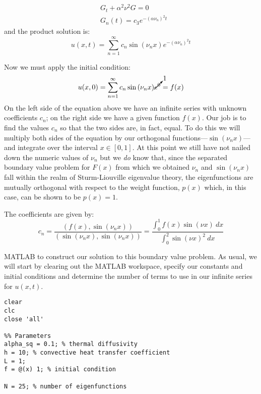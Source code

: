 \begin{align*}
&G_{t} + \alpha^2 \nu^2 G = 0 \\
&G_n(t) = c_3e^{-\left(\alpha \nu_n \right)^2 t}
\end{align*}
and the product solution is:
\begin{equation*}
u(x,t) = \sum\limits_{n=1}^{\infty} c_n \sin{(\nu_n x)}e^{-\left(\alpha \nu_n \right)^2t}
\end{equation*}

\vspace{0.25cm}

\noindent Now we must apply the initial condition:
\begin{equation*}
u(x,0) = \sum\limits_{n=1}^{\infty}c_n \sin{(\nu_n x)}\cancelto{1}{e^{0}} = f(x)
\end{equation*}
On the left side of the equation above we have an infinite series with unknown coefficients $c_n$; on the right side we have a given function $f(x)$.  Our job is to find the values $c_n$ so that the two sides are, in fact, equal.  To do this we will multiply both sides of the equation by our orthogonal functions---$\sin{(\nu_n x)}$---and integrate over the interval $x \in [0,1]$.   At this point we still have not nailed down the numeric values of $\nu_n$ but we \emph{do} know that, since the separated boundary value problem for $F(x)$ from which we obtained $\nu_n$ and $\sin{(\nu_n x)}$ fall within the realm of Sturm-Liouville eigenvalue theory, the eigenfunctions are mutually orthogonal with respect to the weight function, $p(x)$ which, in this case, can be shown to be $p(x)=1$. 

The coefficients are given by:
\begin{equation*}
c_n = \frac{\left(f(x),\sin{(\nu_n x)}\right)}{\left( \sin{(\nu_n x)}, \sin{(\nu_n x)}\right)} = \frac{\int_0^1 f(x) \sin{(\nu x)}\ dx}{\int_0^2 \sin{(\nu x)}^2 \ dx}
\end{equation*}

 MATLAB to construct our solution to this boundary value problem.  As usual, we will start by clearing out the MATLAB workspace, specify our constants and initial conditions and determine the number of terms to use in our infinite series for $u(x,t)$.

\begin{lstlisting}[name=lec28-ex1, style=myMatlab]
clear
clc
close 'all'

%% Parameters
alpha_sq = 0.1; % thermal diffusivity
h = 10; % convective heat transfer coefficient
L = 1;
f = @(x) 1; % initial condition

N = 25; % number of eigenfunctions


\end{lstlisting}

